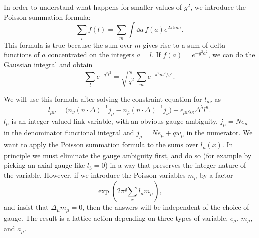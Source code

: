 
In order to understand what happens for smaller values of $g^2$, we introduce
the Poisson summation formula:
\begin{equation*}
  \sum_l f(l)=\sum_m\int\dd a\,f(a)e^{2\pi\ii ma}.
\end{equation*}
This formula is true because the sum over $m$ gives rise to a sum of delta
functions of $a$ concentrated on the integers $a=l$. If
$f(a)=e^{-g^2a^2}$, we can do the Gaussian integral and obtain
\begin{equation*}
  \sum_l e^{-g^2l^2}=\sqrt{\frac{\pi}{g^2}}\sum_m
  e^{-\pi^2m^2/g^2}.
\end{equation*}

We will use this formula after solving the constraint equation for $l_{\mu\nu}$
as
\begin{equation*}
  l_{\mu\nu}=\bigl(n_\nu(n\cdot\Delta)^{-1}j_\mu
  -n_\mu(n\cdot\Delta)^{-1}j_\nu\bigr)
  +\epsilon_{\mu\nu\lambda\kappa}\Delta^\lambda l^\kappa.
\end{equation*}
$l_\mu$ is an integer-valued link variable, with an obvious gauge ambiguity.
$j_\mu=Ne_\mu$ in the denominator functional integral and
$j_\mu=Ne_\mu+qw_\mu$ in the numerator. We want to apply the Poisson summation
formula to the sums over $l_\mu(x)$. In principle we must eliminate the gauge
ambiguity first, and do so (for example by picking an axial gauge like
$l_3=0$) in a way that preserves the integer nature of the variable. However,
if we introduce the Poisson variables $m_\mu$ by a factor
\begin{equation*}
  \exp\!\left(2\pi\ii\sum_x l_\mu m_\mu\right),
\end{equation*}
and insist that $\Delta_\mu m_\mu=0$, then the answers will be independent of
the choice of gauge. The result is a lattice action depending on three types of
variable, $e_\mu$, $m_\mu$, and $a_\mu$.

